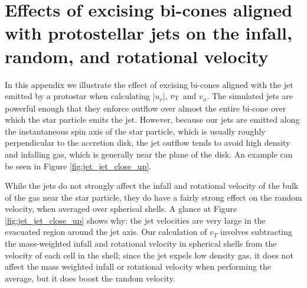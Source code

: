 \documentclass[../dissertation.tex]{subfiles}
\begin{document}
%
%
%
%
\section{Effects of excising bi-cones aligned with protostellar jets on the infall, random, and rotational velocity} \label{sec:jet_jet_cone_sub}
In this appendix we illustrate the effect of excising bi-cones aligned with the jet emitted by a protostar when calculating $\lvert u_r \rvert$, $v_{\rm T}$ and $v_\phi$. The simulated jets are powerful enough that they enforce outflow over almost the entire bi-cone over which the star particle emits the jet. However, because our jets are emitted along the instantaneous spin axis of the star particle, which is usually roughly perpendicular to the accretion disk, the jet outflow tends to avoid high density and infalling gas, which is generally near the plane of the disk. An example can be seen in Figure \ref{fig:jet_jet_close_up}.

While the jets do not strongly affect the infall and rotational velocity of the bulk of the gas near the star particle, they do have a fairly strong effect on the random velocity, when averaged over spherical shells. A glance at Figure \ref{fig:jet_jet_close_up} shows why: the jet velocities are very large in the evacuated region around the jet axis. Our calculation of $v_T$ involves subtracting the mass-weighted infall and rotational velocity in spherical shells from the velocity of each cell in the shell; since the jet expels low density gas, it does not affect the mass weighted infall or rotational velocity when performing the average, but it does boost the random velocity.
\end{document}
